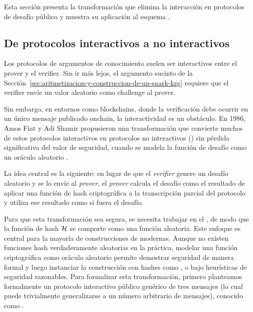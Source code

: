 
Esta sección presenta la transformación que elimina la interacción en protocolos de desafío público y muestra su aplicación al esquema \KZG.

\subsection{De protocolos interactivos a no interactivos}
\label{subsec:apendice-b-fiat-shamir-de-protocolos-interactivos-a-no-interactivos}

Los protocolos de argumentos de conocimiento suelen ser interactivos entre el prover y el verifier. Sin ir más lejos, el argumento sucinto \KZG de la Sección~\ref{sec:aritmetizacion-y-construccion-de-un-snark-kzg} requiere que el verifier envíe un valor aleatorio como challenge al prover.

Sin embargo, en entornos como blockchains, donde la verificación debe ocurrir en un único mensaje publicado onchain, la interactividad es un obstáculo. En 1986, Amos Fiat y Adi Shamir propusieron una transformación que convierte muchos de estos protocolos interactivos en protocolos no interactivos (\NIZK) sin pérdida significativa del valor de seguridad, cuando se modela la función de desafío como un oráculo aleatorio \cite{Fiat, Bellare1993}.

La idea central es la siguiente: en lugar de que el \textit{verifier} genere un desafío aleatorio y se lo envíe al \textit{prover}, el \textit{prover} calcula el desafío como el resultado de aplicar una función de hash criptográfica a la transcripción parcial del protocolo y utiliza ese resultado como si fuera el desafío.

Para que esta transformación sea segura, se necesita trabajar en el \ROM, de modo que la función de hash $\mathcal{H}$ se comporte como una función aleatoria. Este enfoque es central para la mayoría de construcciones de \zkSNARK modernas. Aunque no existen funciones hash verdaderamente aleatorias en la práctica, modelar una función criptográfica como oráculo aleatorio permite demostrar seguridad de manera formal y luego instanciar la construcción con hashes como \SHATwoFiveSix, \BLAKETwo o \PoseidonHash bajo heurísticas de seguridad razonables. Para formalizar esta transformación, primero planteamos formalmente un protocolo interactivo público genérico de tres mensajes (lo cual puede trivialmente generalizarse a un número arbitrario de mensajes), conocido como \SigmaProtocol.

